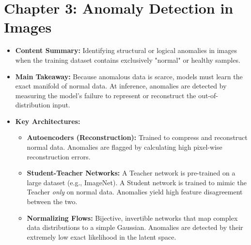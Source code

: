 \section*{Chapter 3: Anomaly Detection in Images}
\begin{itemize}
    \item \textbf{Content Summary:} Identifying structural or logical anomalies in images when the training dataset contains exclusively "normal" or healthy samples.
    \item \textbf{Main Takeaway:} Because anomalous data is scarce, models must learn the exact manifold of normal data. At inference, anomalies are detected by measuring the model's failure to represent or reconstruct the out-of-distribution input.
    \item \textbf{Key Architectures:}
    \begin{itemize}
        \item \textbf{Autoencoders (Reconstruction):} Trained to compress and reconstruct normal data. Anomalies are flagged by calculating high pixel-wise reconstruction errors.
        \item \textbf{Student-Teacher Networks:} A Teacher network is pre-trained on a large dataset (e.g., ImageNet). A Student network is trained to mimic the Teacher \textit{only} on normal data. Anomalies yield high feature disagreement between the two.
        \item \textbf{Normalizing Flows:} Bijective, invertible networks that map complex data distributions to a simple Gaussian. Anomalies are detected by their extremely low exact likelihood in the latent space.
    \end{itemize}
\end{itemize}

